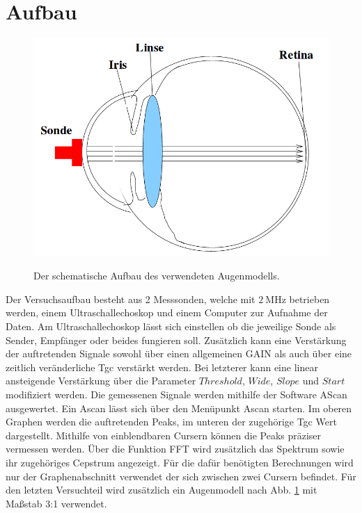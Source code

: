 \section{Aufbau}
\label{sec:Aufbau}

\begin{figure}
 \centering
 \caption{Der schematische Aufbau des verwendeten Augenmodells.}
 \includegraphics[width=\linewidth-170pt,height=\textheight-170pt,keepaspectratio]{content/AUGE.png}
 \label{fig:auge}
\end{figure}

Der Versuchsaufbau besteht aus 2 Messsonden, welche mit $\SI{2}{\mega\hertz}$
betrieben werden, einem Ultraschallechoskop und einem Computer zur Aufnahme der Daten.
Am Ultraschallechoskop lässt sich einstellen ob die jeweilige Sonde als Sender,
Empfänger oder beides fungieren soll. Zusätzlich kann eine Verstärkung der
auftretenden Signale sowohl über einen allgemeinen GAIN als auch über eine zeitlich
veränderliche Tgc verstärkt werden. Bei letzterer kann eine linear ansteigende Verstärkung
über die Parameter $Threshold$, $Wide$, $Slope$ und $Start$
modifiziert werden. Die gemessenen Signale werden mithilfe der
Software AScan ausgewertet. Ein Ascan lässt sich über den Menüpunkt Ascan starten. Im oberen
Graphen werden die auftretenden Peaks, im unteren der zugehörige Tgc Wert
dargestellt. Mithilfe von einblendbaren Cursern können die Peaks präziser vermessen
werden. Über die Funktion FFT wird zusätzlich das Spektrum sowie ihr zugehöriges
Cepstrum angezeigt. Für die dafür benötigten Berechnungen wird nur der
Graphenabschnitt verwendet der sich zwischen zwei Cursern befindet.
Für den letzten Versuchteil wird zusätzlich ein Augenmodell nach Abb. \ref{fig:auge} mit Maßstab 3:1 verwendet.

